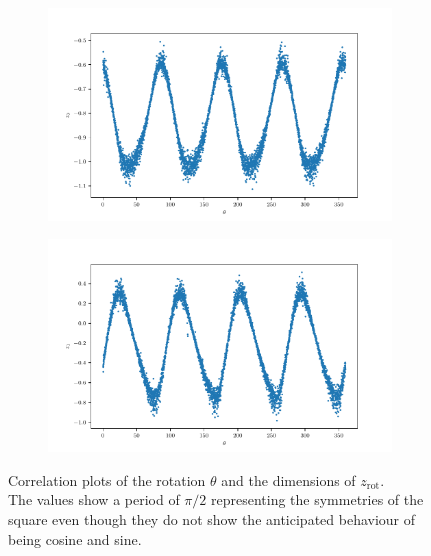 \documentclass[10pt,a4paper]{article}
\newcommand{\rot}{\ensuremath{\text{rot}\xspace}}
\begin{document}
\begin{figure}[!ht]
    \centering
    \begin{subfigure}{0.49\textwidth}
        \centering
        \includegraphics[width=\textwidth] {square_theta_z0.pdf}
        \caption{}
        \label{fig_zo}
    \end{subfigure}
    \begin{subfigure}{0.49\textwidth}
        \centering	
        \includegraphics[width=\textwidth]{square_theta_z1.pdf}
        \caption{}
        \label{fig_z1}
    \end{subfigure}
    \caption{Correlation plots of the rotation $\theta$ and the dimensions of $z_{\rot}$.\\
    The values show a period of $\pi/2$ representing the symmetries of the square even though they do not show the anticipated behaviour of being cosine and sine.} \label{Square_corr_rot}
\end{figure}
\end{document}
